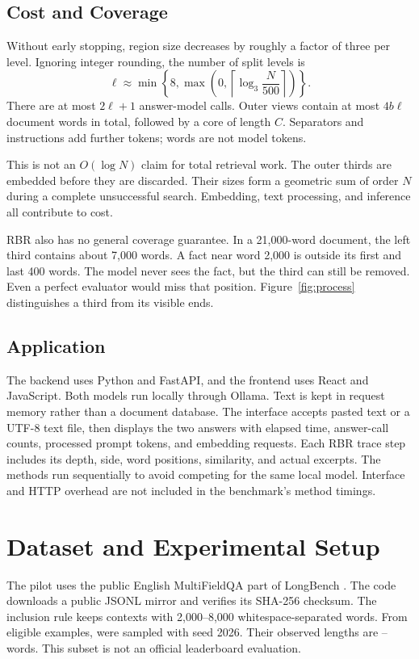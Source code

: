 \documentclass[conference]{IEEEtran}
\begin{document}
\subsection{Cost and Coverage}
Without early stopping, region size decreases by roughly a factor of three per level. Ignoring integer rounding, the number of split levels is
\begin{equation}
\ell\approx\min\left\{8,\max\left(0,\left\lceil\log_3\frac{N}{500}\right\rceil\right)\right\}.
\end{equation}
There are at most $2\ell+1$ answer-model calls. Outer views contain at most $4b\ell$ document words in total, followed by a core of length $C$. Separators and instructions add further tokens; words are not model tokens.

This is not an $O(\log N)$ claim for total retrieval work. The outer thirds are embedded before they are discarded. Their sizes form a geometric sum of order $N$ during a complete unsuccessful search. Embedding, text processing, and inference all contribute to cost.

RBR also has no general coverage guarantee. In a 21,000-word document, the left third contains about 7,000 words. A fact near word 2,000 is outside its first and last 400 words. The model never sees the fact, but the third can still be removed. Even a perfect evaluator would miss that position. Figure~\ref{fig:process} distinguishes a third from its visible ends.

\subsection{Application}
The backend uses Python and FastAPI, and the frontend uses React and JavaScript. Both models run locally through Ollama. Text is kept in request memory rather than a document database. The interface accepts pasted text or a UTF-8 text file, then displays the two answers with elapsed time, answer-call counts, processed prompt tokens, and embedding requests. Each RBR trace step includes its depth, side, word positions, similarity, and actual excerpts. The methods run sequentially to avoid competing for the same local model. Interface and HTTP overhead are not included in the benchmark's method timings.

\section{Dataset and Experimental Setup}
The pilot uses the public English MultiFieldQA part of LongBench \cite{longbench}. The code downloads a public JSONL mirror and verifies its SHA-256 checksum. The inclusion rule keeps contexts with 2,000--8,000 whitespace-separated words. From \EligibleCount{} eligible examples, \PilotCount{} were sampled with seed 2026. Their observed lengths are \MinimumWords{}--\MaximumWords{} words. This subset is not an official leaderboard evaluation.
\end{document}
